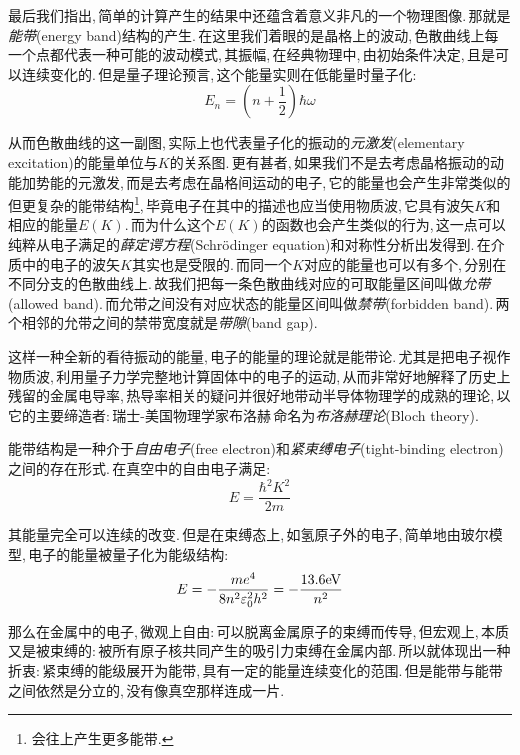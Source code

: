 最后我们指出,\,简单的计算产生的结果中还蕴含着意义非凡的一个物理图像.\,那就是\emph{能带}(energy band)结构的产生.\,在这里我们着眼的是晶格上的波动,\,色散曲线上每一个点都代表一种可能的波动模式,\,其振幅,\,在经典物理中,\,由初始条件决定,\,且是可以连续变化的.\,但是量子理论预言,\,这个能量实则在低能量时量子化:
\[E_n=\left(n+\frac{1}{2}\right)\hbar\omega\]

从而色散曲线的这一副图,\,实际上也代表量子化的振动的\emph{元激发}(elementary excitation)的能量单位与$K$的关系图.\,更有甚者,\,如果我们不是去考虑晶格振动的动能加势能的元激发,\,而是去考虑在晶格间运动的电子,\,它的能量也会产生非常类似的但更复杂的能带结构\footnote{会往上产生更多能带.},\,毕竟电子在其中的描述也应当使用物质波,\,它具有波矢$K$和相应的能量$E(K)$.\,而为什么这个$E(K)$的函数也会产生类似的行为,\,这一点可以纯粹从电子满足的\emph{薛定谔方程}(Schr\"odinger equation)和对称性分析出发得到.\,在介质中的电子的波矢$K$其实也是受限的.\,而同一个$K$对应的能量也可以有多个,\,分别在不同分支的色散曲线上.\,故我们把每一条色散曲线对应的可取能量区间叫做\emph{允带}(allowed band).\,而允带之间没有对应状态的能量区间叫做\emph{禁带}(forbidden band).\,两个相邻的允带之间的禁带宽度就是\emph{带隙}(band gap).

这样一种全新的看待振动的能量,\,电子的能量的理论就是能带论.\,尤其是把电子视作物质波,\,利用量子力学完整地计算固体中的电子的运动,\,从而非常好地解释了历史上残留的金属电导率,\,热导率相关的疑问并很好地带动半导体物理学的成熟的理论,\,以它的主要缔造者:\,瑞士-美国物理学家布洛赫\,命名为\emph{布洛赫理论}(Bloch theory).

能带结构是一种介于\emph{自由电子}(free electron)和\emph{紧束缚电子}(tight-binding electron)之间的存在形式.\,在真空中的自由电子满足:
\[E=\frac{\hbar^2K^2}{2m}\]

其能量完全可以连续的改变.\,但是在束缚态上,\,如氢原子外的电子,\,简单地由玻尔模型,\,电子的能量被量子化为能级结构:
\[E=-\frac{me^4}{8n^2\varepsilon_0^2h^2}=-\frac{13.6{\rm eV}}{n^2}\]

那么在金属中的电子,\,微观上自由:\,可以脱离金属原子的束缚而传导,\,但宏观上,\,本质又是被束缚的:\,被所有原子核共同产生的吸引力束缚在金属内部.\,所以就体现出一种折衷:\,紧束缚的能级展开为能带,\,具有一定的能量连续变化的范围.\,但是能带与能带之间依然是分立的,\,没有像真空那样连成一片.


